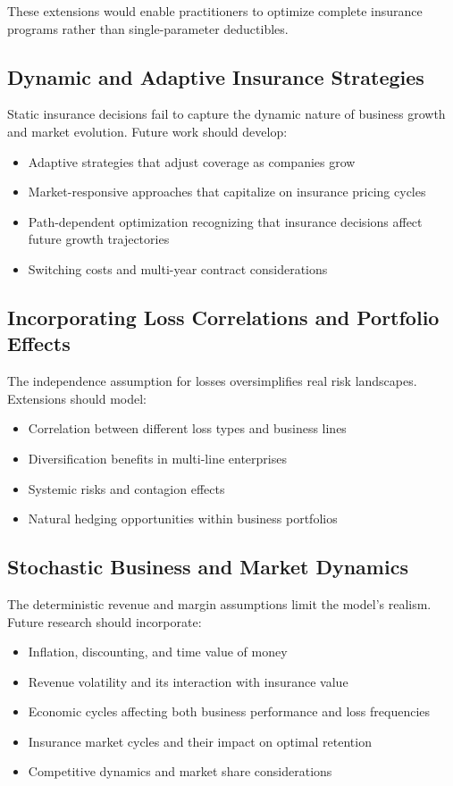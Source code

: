 \documentclass[11pt,letterpaper]{article}
\begin{document}
These extensions would enable practitioners to optimize complete insurance programs rather than single-parameter deductibles.

\subsection{Dynamic and Adaptive Insurance Strategies}

Static insurance decisions fail to capture the dynamic nature of business growth and market evolution. Future work should develop:
\begin{itemize}
    \item Adaptive strategies that adjust coverage as companies grow
    \item Market-responsive approaches that capitalize on insurance pricing cycles
    \item Path-dependent optimization recognizing that insurance decisions affect future growth trajectories
    \item Switching costs and multi-year contract considerations
\end{itemize}

\subsection{Incorporating Loss Correlations and Portfolio Effects}

The independence assumption for losses oversimplifies real risk landscapes. Extensions should model:
\begin{itemize}
    \item Correlation between different loss types and business lines
    \item Diversification benefits in multi-line enterprises
    \item Systemic risks and contagion effects
    \item Natural hedging opportunities within business portfolios
\end{itemize}

\subsection{Stochastic Business and Market Dynamics}

The deterministic revenue and margin assumptions limit the model's realism. Future research should incorporate:
\begin{itemize}
    \item Inflation, discounting, and time value of money
    \item Revenue volatility and its interaction with insurance value
    \item Economic cycles affecting both business performance and loss frequencies
    \item Insurance market cycles and their impact on optimal retention
    \item Competitive dynamics and market share considerations
\end{itemize}
\end{document}
